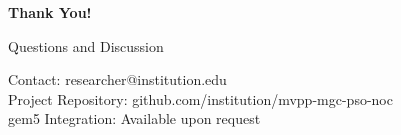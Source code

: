 \documentclass[10pt,aspectratio=169]{beamer}
\begin{document}
\begin{frame}[standout]
    \begin{center}
        \Huge{\textbf{Thank You!}}
        
        \vspace{1cm}
        
        \Large{Questions and Discussion}
        
        \vspace{1cm}
        
        \normalsize{
            Contact: researcher@institution.edu\\
            Project Repository: github.com/institution/mvpp-mgc-pso-noc\\
            gem5 Integration: Available upon request
        }
    \end{center}
\end{frame}

\appendix
\end{document}
